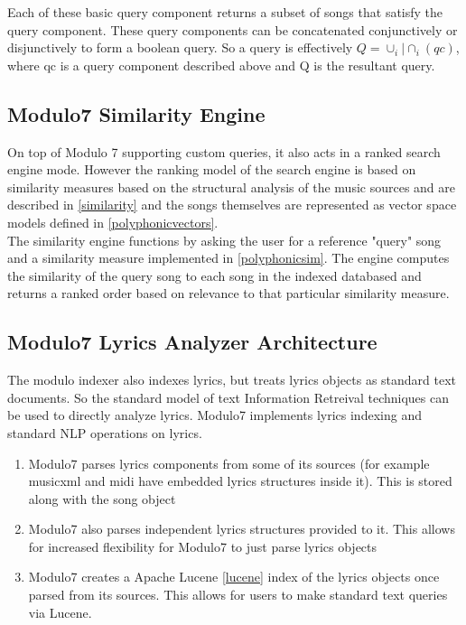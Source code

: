 \noindent Each of these basic query component returns a subset of songs that satisfy the query component. These query components can be concatenated conjunctively or disjunctively to form a boolean query. So a query is effectively $Q = \cup_i | \cap_i (qc)$, where qc is a query component described above and Q is the resultant query. 

\subsection{Modulo7 Similarity Engine} \label{simengine}

\noindent On top of Modulo 7 supporting custom queries, it also acts in a ranked search engine mode. However the ranking model of the search engine is based on similarity measures based on the structural analysis of the music sources and are described in \ref{similarity} and the songs themselves are represented as vector space models defined in \ref{polyphonicvectors}.  \\

\noindent The similarity engine functions by asking the user for a reference "query" song and a similarity measure implemented in \ref{polyphonicsim}. The engine computes the similarity of the query song to each song in the indexed databased and returns a ranked order based on relevance to that particular similarity measure. 

\subsection{Modulo7 Lyrics Analyzer Architecture} \label{lyricsarch}

\noindent The modulo indexer also indexes lyrics, but treats lyrics objects as standard text documents. So the standard model of text Information Retreival techniques can be used to directly analyze lyrics. Modulo7 implements lyrics indexing and standard NLP operations on lyrics.

\begin{enumerate}
\item Modulo7 parses lyrics components from some of its sources (for example musicxml and midi have embedded lyrics structures inside it). This is stored along with the song object
\item Modulo7 also parses independent lyrics structures provided to it. This allows for increased flexibility for Modulo7 to just parse lyrics objects
\item Modulo7 creates a Apache Lucene \ref{lucene} index of the lyrics objects once parsed from its sources. This allows for users to make standard text queries via Lucene. 

\end{enumerate}

